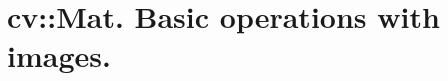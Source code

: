 
\chapter{cv::Mat. Basic operations with images.}
\renewcommand{\curModule}{Working with images.}


